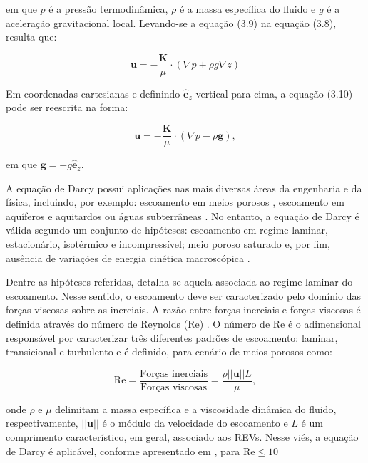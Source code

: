 em que $p$ é a pressão termodinâmica, $\rho$ é a massa específica do fluido e $g$ é a aceleração gravitacional local. Levando-se a equação (3.9) na equação (3.8), resulta que:

\begin{equation}
	\mathbf{u} = -\frac{\mathbf{K}}{\mu} \cdot (\nabla p + \rho g \nabla z)
\end{equation}

Em coordenadas cartesianas e definindo $\mathbf{\hat{e}}_{z}$ vertical para cima, a equação (3.10) pode ser reescrita na forma:

\begin{equation}
	\mathbf{u} = - \frac{\mathbf{K}}{\mu} \cdot (\nabla p - \rho \mathbf{g}),
\end{equation}

em que $\mathbf{g} = -g\mathbf{\hat{e}}_{z}$. 

A equação de Darcy possui aplicações nas mais diversas áreas da engenharia e da física, incluindo, por exemplo: escoamento em meios porosos \cite{Bear2013}, escoamento em aquíferos e aquitardos ou águas subterrâneas \cite{Atangana2018}. No entanto, a equação de Darcy é válida segundo um conjunto de hipóteses: escoamento em regime laminar, estacionário, isotérmico e incompressível; meio poroso saturado e, por fim, ausência de variações de energia cinética macroscópica \cite{Freeze1979}.

Dentre as hipóteses referidas, detalha-se aquela associada ao regime laminar do escoamento. Nesse sentido, o escoamento deve ser caracterizado pelo domínio das forças viscosas sobre as inerciais. A razão entre forças inerciais e forças viscosas é definida através do número de Reynolds (Re) \cite{Pontes2016}. O número de Re é o adimensional responsável por caracterizar três diferentes padrões de escoamento: laminar, transicional e turbulento e é definido, para cenário de meios porosos como:

\begin{equation}
	\text{Re} = \frac{\text{Forças inerciais}}{\text{Forças viscosas}} = \frac{\rho ||\mathbf{u}|| L}{\mu},
\end{equation}

onde $\rho$ e $\mu$ delimitam a massa específica e a viscosidade dinâmica do fluido, respectivamente, $||\mathbf{u}||$ é o módulo da velocidade do escoamento e $L$ é um comprimento característico, em geral, associado aos REVs. Nesse viés, a equação de Darcy é aplicável, conforme apresentado em \cite{Bear2013}, para $\text{Re} \leq 10 $


